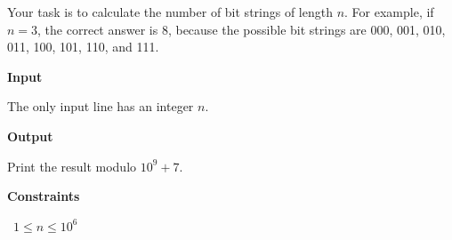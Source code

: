 Your task is to calculate the number of bit strings of length $n$.
For example, if $n=3$, the correct answer is $8$, because the possible bit strings are 000, 001, 010, 011, 100, 101, 110, and 111.

\vspace{0.3cm}\noindent\textbf{Input}

The only input line has an integer $n$.

\vspace{0.3cm}\noindent\textbf{Output}

Print the result modulo $10^9+7$.

\vspace{0.3cm}\noindent\textbf{Constraints}

\textbullet\ $1 \le n \le 10^6$